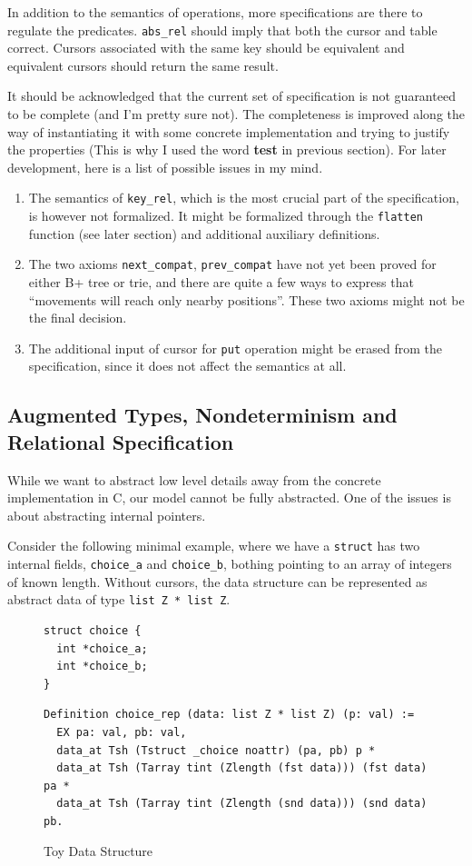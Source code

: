 \documentclass[runningheads]{llncs}
\begin{document}
In addition to the semantics of operations, more specifications are there to
regulate the predicates. \texttt{abs\_rel} should imply that both the cursor and
table correct. Cursors associated with the same key should be equivalent and
equivalent cursors should return the same result.

It should be acknowledged that the current set of specification is not guaranteed
to be complete (and I'm pretty sure not). The completeness is improved along the
way of instantiating it with some concrete implementation and trying to justify
the properties (This is why I used the word \textbf{test} in previous section).
For later development, here is a list of possible issues in my mind.

\begin{enumerate}
\item The semantics of \texttt{key\_rel}, which is the most crucial part of the
  specification, is however not formalized. It might be formalized through the
  \texttt{flatten} function (see later section) and additional auxiliary
  definitions.
\item The two axioms \texttt{next\_compat}, \texttt{prev\_compat} have not yet
  been proved for either B+ tree or trie, and there are quite a few ways to
  express that ``movements will reach only nearby positions''. These two axioms
  might not be the final decision.
\item The additional input of cursor for \texttt{put} operation might be erased
  from the specification, since it does not affect the semantics at all.
\end{enumerate}

\subsection{Augmented Types, Nondeterminism and Relational Specification}

While we want to abstract low level details away from the concrete implementation
in C, our model cannot be fully abstracted. One of the issues is about
abstracting internal pointers.

Consider the following minimal example, where we have a \texttt{struct} has two
internal fields, \texttt{choice\_a} and \texttt{choice\_b}, bothing pointing to
an array of integers of known length. Without cursors, the data structure can be
represented as abstract data of type \texttt{list Z * list Z}.

\begin{figure}[htbp]
  \centering
\begin{verbatim}
struct choice {
  int *choice_a;
  int *choice_b;
}
\end{verbatim}
\begin{verbatim}
Definition choice_rep (data: list Z * list Z) (p: val) :=
  EX pa: val, pb: val,
  data_at Tsh (Tstruct _choice noattr) (pa, pb) p *
  data_at Tsh (Tarray tint (Zlength (fst data))) (fst data) pa *
  data_at Tsh (Tarray tint (Zlength (snd data))) (snd data) pb. 
\end{verbatim}
  \caption{Toy Data Structure}\label{fig:choice}
\end{figure}
\end{document}
